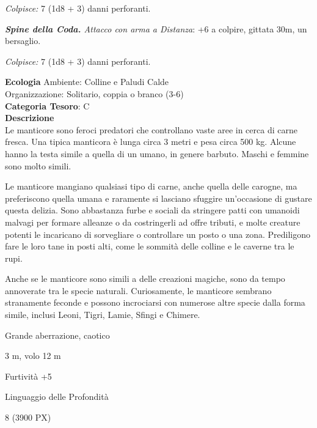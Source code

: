\begin{multicols}{2}
{\emph{Colpisce:} 7 (1d8 + 3) danni perforanti.

\emph{\textbf{Spine della Coda.} Attacco con arma a Distanza}: +6 a colpire, gittata 30m, un bersaglio.

\emph{Colpisce:} 7 (1d8 + 3) danni perforanti.

\textbf{Ecologia}
Ambiente: Colline e Paludi Calde\\
Organizzazione: Solitario, coppia o branco (3-6)\\
\textbf{Categoria Tesoro}: C\\
\textbf{Descrizione}\\
Le manticore sono feroci predatori che controllano vaste aree in cerca di carne fresca. Una tipica manticora è lunga circa 3 metri e pesa circa 500 kg. Alcune hanno la testa simile a quella di un umano, in genere barbuto. Maschi e femmine sono molto simili.

Le manticore mangiano qualsiasi tipo di carne, anche quella delle carogne, ma preferiscono quella umana e raramente si lasciano sfuggire un'occasione di gustare questa delizia. Sono abbastanza furbe e sociali da stringere patti con umanoidi malvagi per formare alleanze o da costringerli ad offre tributi, e molte creature potenti le incaricano di sorvegliare o controllare un posto o una zona. Prediligono fare le loro tane in posti alti, come le sommità delle colline e le caverne tra le rupi.

Anche se le manticore sono simili a delle creazioni magiche, sono da tempo annoverate tra le specie naturali. Curiosamente, le manticore sembrano stranamente feconde e possono incrociarsi con numerose altre specie dalla forma simile, inclusi Leoni, Tigri, Lamie, Sfingi e Chimere.

\begin{description}[noitemsep, topsep=0pt, parsep=0pt, partopsep=0pt, itemsep=1pt, leftmargin=2.35cm,  labelwidth=2.2cm, itemindent=0cm, listparindent=0pt] %
\setlength{\baselineskip}{10pt}
\item[\textbf{Taglia/Tipo}] Grande aberrazione, caotico
\item[\textbf{Caratt.}] 
\item[\textbf{Punti Ferita}] 
\item[\textbf{Movimento}] 3 m, volo 12 m
\item[\textbf{Tiri Salvez.}] 
\item[\textbf{Comp.}] Furtività +5
\item[\textbf{Sensi}] 
\item[\textbf{Linguaggi}] Linguaggio delle Profondità
\item[\textbf{Sfida}] 8 (3900 PX)
\end{description}
\smallskip

}
\end{multicols}
